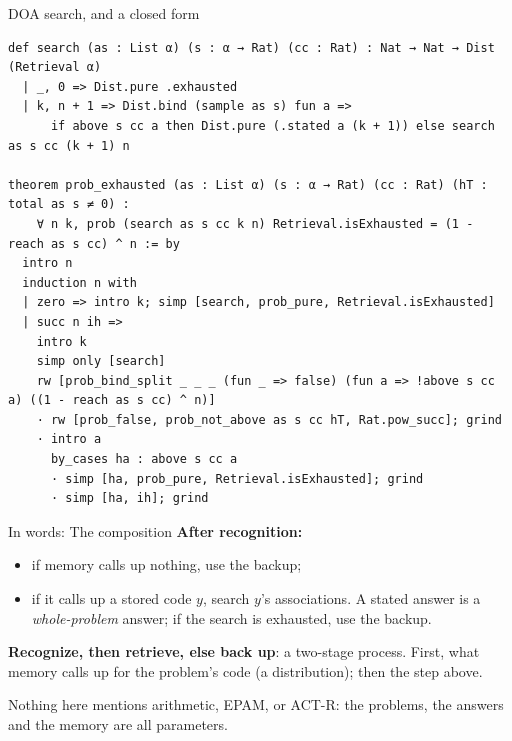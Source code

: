 \documentclass[aspectratio=169,11pt]{beamer}
\begin{document}
\begin{frame}[fragile]{DOA search, and a closed form}
\begin{Verbatim}
def search (as : List α) (s : α → Rat) (cc : Rat) : Nat → Nat → Dist (Retrieval α)
  | _, 0 => Dist.pure .exhausted
  | k, n + 1 => Dist.bind (sample as s) fun a =>
      if above s cc a then Dist.pure (.stated a (k + 1)) else search as s cc (k + 1) n

theorem prob_exhausted (as : List α) (s : α → Rat) (cc : Rat) (hT : total as s ≠ 0) :
    ∀ n k, prob (search as s cc k n) Retrieval.isExhausted = (1 - reach as s cc) ^ n := by
  intro n
  induction n with
  | zero => intro k; simp [search, prob_pure, Retrieval.isExhausted]
  | succ n ih =>
    intro k
    simp only [search]
    rw [prob_bind_split _ _ _ (fun _ => false) (fun a => !above s cc a) ((1 - reach as s cc) ^ n)]
    · rw [prob_false, prob_not_above as s cc hT, Rat.pow_succ]; grind
    · intro a
      by_cases ha : above s cc a
      · simp [ha, prob_pure, Retrieval.isExhausted]; grind
      · simp [ha, ih]; grind
\end{Verbatim}
\end{frame}

\begin{frame}{In words: The composition}
  \textbf{After recognition:}
  \begin{itemize}
    \item if memory calls up nothing, use the backup;
    \item if it calls up a stored code $y$, search $y$'s associations. A stated answer is a \emph{whole-problem} answer; if the search is exhausted, use the backup.
  \end{itemize}
  \bigskip
  \textbf{Recognize, then retrieve, else back up}: a two-stage process. First, what memory calls up for the problem's code (a distribution); then the step above.
  \bigskip

  Nothing here mentions arithmetic, EPAM, or ACT-R: the problems, the answers and the memory are all parameters.
\end{frame}
\end{document}
